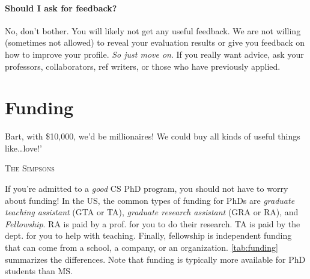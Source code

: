 \documentclass[oneside,11pt,dvipsnames]{book}
\def\chapterinfo#1{%
  \addcontentsline{toc}{chapterinfo}{%
    \noexpand\numberline{}\color{black}{#1}}%
}
\begin{document}
\subsubsection{Should I ask for feedback?}
No, don't bother.  You will likely not get any useful feedback.  We are not willing (sometimes not allowed) to reveal your evaluation results or give you feedback on how to improve your profile. \emph{So just move on}.  If you really want advice, ask your professors, collaborators, ref writers, or those who have previously applied.


\chapter{Funding}\label{sec:funding}

\chapterinfo{TAs, RAs, and fellowships are main funding sources for PhDs.  TAs are provided by the department to help with classes. RAs are given by profs. to help with their research.  Fellowships, provided by the university, department, or external sources such as government or industry, give move flexibility but can be very competitive.}

\epigraph{Bart, with \$10,000, we’d be millionaires! We could buy all kinds of useful things like…love!’}{\textsc{The Simpsons}}
If you're admitted to a \emph{good} CS PhD program, you should not have to worry about funding!
In the US, the common types of funding for PhDs are \emph{graduate teaching assistant} (GTA or TA), \emph{graduate research assistant} (GRA or RA), and \emph{Fellowship}.
RA is paid by a prof. for you to do their research. TA is paid by the dept. for you to help with teaching. Finally, fellowship is independent funding that can come from a school, a company, or an organization. \autoref{tab:funding} summarizes the differences.
Note that funding is typically more available for PhD students than
MS.
\end{document}
